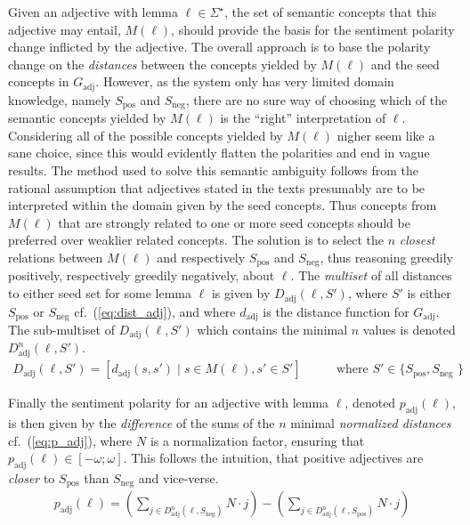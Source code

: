 Given an adjective with lemma $\ell \in \Sigma^\star$, the set of semantic concepts that this adjective may entail, $M(\ell)$, should provide the basis for the sentiment polarity change inflicted by the adjective. The overall approach is to base the polarity change on the \emph{distances} between the concepts yielded by $M(\ell)$ and the seed concepts in $G_\mathrm{adj}$. However, as the system only has very limited domain knowledge, namely $S_\mathrm{pos}$ and $S_\mathrm{neg}$, there are no sure way of choosing which of the semantic concepts yielded by $M(\ell)$ is the ``right'' interpretation of $\ell$. Considering all of the possible concepts yielded by $M(\ell)$ nigher seem like a sane choice, since this would evidently flatten the polarities and end in vague results. The method used to solve this semantic ambiguity follows from the rational assumption that adjectives stated in the texts presumably are to be interpreted within the domain given by the seed concepts. Thus concepts from $M(\ell)$ that are strongly related to one or more seed concepts should be preferred over weaklier related concepts. The solution is to select the $n$ \emph{closest} relations between $M(\ell)$ and respectively $S_\mathrm{pos}$ and $S_\mathrm{neg}$, thus reasoning greedily positively, respectively greedily negatively, about $\ell$. The \emph{multiset} of all distances to either seed set for some lemma $\ell$ is given by $D_\mathrm{adj}(\ell, S')$, where $S'$ is either $S_\mathrm{pos}$ or $S_\mathrm{neg}$ cf.\ (\ref{eq:dist_adj}), and where $d_\mathrm{adj}$ is the distance function for $G_\mathrm{adj}$. The sub-multiset of $D_\mathrm{adj}(\ell, S')$ which contains the minimal $n$ values is denoted $D^n_\mathrm{adj}(\ell, S')$.
\begin{align}
    D_\mathrm{adj}(\ell, S') = \left[ d_\mathrm{adj}(s, s') \; | \; s \in M(\ell), s' \in S' \right] & \hspace{2em} \text{where $S' \in \{ S_\mathrm{pos}, S_\mathrm{neg}$ \}}
	\label{eq:dist_adj}
\end{align}

Finally the sentiment polarity for an adjective with lemma $\ell$, denoted $p_\mathrm{adj}(\ell)$, is then given by the \emph{difference} of the sums of the $n$ minimal \emph{normalized distances} cf.\ (\ref{eq:p_adj}), where $N$ is a normalization factor, ensuring that $p_\mathrm{adj}(\ell) \in \left[-\omega; \omega \right]$. This follows the intuition, that positive adjectives are \emph{closer} to $S_\mathrm{pos}$ than $S_\mathrm{neg}$ and vice-verse.
\begin{align}
    p_\mathrm{adj}(\ell) =     	
    	\left( \sum_{j \in  D^n_\mathrm{adj}(\ell, S_\mathrm{neg}) } N \cdot j \right) -
		\left( \sum_{j \in  D^n_\mathrm{adj}(\ell, S_\mathrm{pos}) } N \cdot j \right)
	\label{eq:p_adj}
\end{align}

